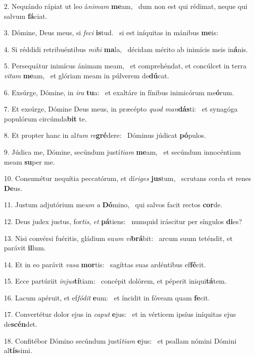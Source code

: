 2. Nequándo rápiat ut leo á\textit{ni}\textit{mam} \textbf{me}am, \ast\  dum non est qui rédimat, neque qui salvum \textbf{fá}ciat.\

3. Dómine, Deus meus, si \textit{fe}\textit{ci} \textbf{is}tud. \ast\  si est iníquitas in mánibus \textbf{me}is:\

4. Si réddidi retribuéntibus \textit{mi}\textit{hi} \textbf{ma}la, \ast\  décidam mérito ab inimícis meis in\textbf{á}nis.\

5. Persequátur inimícus ánimam meam, \dag\  et comprehéndat, et concúlcet in terra \textit{vi}\textit{tam} \textbf{me}am, \ast\  et glóriam meam in púlverem de\textbf{dú}cat.\

6. Exsúrge, Dómine, in \textit{i}\textit{ra} \textbf{tu}a: \ast\  et exaltáre in fínibus inimicórum me\textbf{ó}rum.\

7. Et exsúrge, Dómine Deus meus, in præcépto \textit{quod} \textit{man}\textbf{dás}ti: \ast\  et synagóga populórum circúmda\textbf{bit} te.\

8. Et propter hanc in al\textit{tum} \textit{re}\textbf{gré}dere: \ast\  Dóminus júdicat \textbf{pó}pulos.\

9. Júdica me, Dómine, secúndum justí\textit{ti}\textit{am} \textbf{me}am, \ast\  et secúndum innocéntiam meam \textbf{su}per me.\

10. Consumétur nequítia peccatórum, et dí\textit{ri}\textit{ges} \textbf{jus}tum, \ast\  scrutans corda et renes \textbf{De}us.\

11. Justum adjutórium me\textit{um} \textit{a} \textbf{Dó}mino, \ast\  qui salvos facit rectos \textbf{cor}de.\

12. Deus judex justus, for\textit{tis}, \textit{et} \textbf{pá}tiens: \ast\  numquid iráscitur per síngulos \textbf{di}es?\

13. Nisi convérsi fuéritis, gládium su\textit{um} \textit{vi}\textbf{brá}bit: \ast\  arcum suum teténdit, et parávit \textbf{il}lum.\

14. Et in eo parávit \textit{va}\textit{sa} \textbf{mor}tis: \ast\  sagíttas suas ardéntibus ef\textbf{fé}cit.\

15. Ecce partúriit \textit{in}\textit{jus}\textbf{tí}tiam: \ast\  concépit dolórem, et péperit iniqui\textbf{tá}tem.\

16. Lacum apéruit, et ef\textit{fó}\textit{dit} \textbf{e}um: \ast\  et íncidit in fóveam quam \textbf{fe}cit.\

17. Convertétur dolor ejus in \textit{ca}\textit{put} \textbf{e}jus: \ast\  et in vérticem ipsíus iníquitas ejus de\textbf{scén}det.\

18. Confitébor Dómino secúndum justí\textit{ti}\textit{am} \textbf{e}jus: \ast\  et psallam nómini Dómini al\textbf{tís}simi.\

